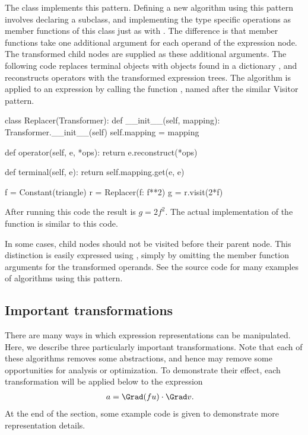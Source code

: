 The  class implements this pattern.  Defining a new
algorithm using this pattern involves declaring a 
subclass, and implementing the type specific operations as member
functions of this class just as with .  The
difference is that member functions take one additional argument for
each operand of the expression node. The transformed child nodes are
supplied as these additional arguments.  The following code replaces
terminal objects with objects found in a dictionary , and
reconstructs operators with the transformed expression trees. The
algorithm is applied to an expression by calling the function
, named after the similar Visitor pattern.
\begin{python}
class Replacer(Transformer):
    def __init__(self, mapping):
        Transformer.__init__(self)
        self.mapping = mapping

    def operator(self, e, *ops):
        return e.reconstruct(*ops)

    def terminal(self, e):
        return self.mapping.get(e, e)

f = Constant(triangle)
r = Replacer({f: f**2})
g = r.visit(2*f)
\end{python}
After running this code the result is $g = 2 f^2$.  The actual
implementation of the  function is similar to this
code.

In some cases, child nodes should not be visited before their parent
node. This distinction is easily expressed using ,
simply by omitting the member function arguments for the transformed
operands. See the source code for many examples of algorithms using
this pattern.

\subsection{Important transformations} \label{ufl:sec:expanding}

There are many ways in which expression representations can be
manipulated.  Here, we describe three particularly important
transformations.  Note that each of these algorithms removes some
abstractions, and hence may remove some opportunities for analysis or
optimization. To demonstrate their effect, each transformation will be
applied below to the expression
\begin{align} \label{ufl:eq:a_before_expand}
a   &= \Grad (f u) \cdot \Grad v.
\end{align}
At the end of the section, some example code is given to demonstrate
more representation details.

